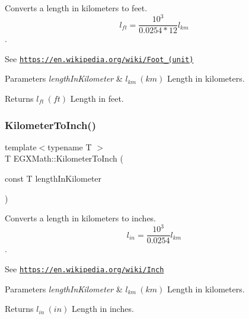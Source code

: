 Converts a length in kilometers to feet. \[ l_{ft}= \frac{10^{3}}{0.0254 * 12} l_{km} \]. 

See \href{https://en.wikipedia.org/wiki/Foot_(unit)}{\tt https\+://en.\+wikipedia.\+org/wiki/\+Foot\+\_\+(unit)} 
\begin{DoxyParams}{Parameters}
{\em length\+In\+Kilometer} & $ l_{km}\ (km)$ Length in kilometers. \\
\hline
\end{DoxyParams}
\begin{DoxyReturn}{Returns}
$ l_{ft}\ (ft)$ Length in feet. 
\end{DoxyReturn}
\mbox{\label{group___e_g_x_math-_conversions-_length_conversions-_s_i-_kilometer-_imperial_ga6f1d41be3b2039495abff4f256148aa7}} 
\subsubsection{\texorpdfstring{Kilometer\+To\+Inch()}{KilometerToInch()}}
{\footnotesize\ttfamily template$<$typename T $>$ \\
T E\+G\+X\+Math\+::\+Kilometer\+To\+Inch (\begin{DoxyParamCaption}\item[{const T}]{length\+In\+Kilometer }\end{DoxyParamCaption})}



Converts a length in kilometers to inches. \[ l_{in}= \frac{10^{3}}{0.0254} l_{km} \]. 

See \href{https://en.wikipedia.org/wiki/Inch}{\tt https\+://en.\+wikipedia.\+org/wiki/\+Inch} 
\begin{DoxyParams}{Parameters}
{\em length\+In\+Kilometer} & $ l_{km}\ (km)$ Length in kilometers. \\
\hline
\end{DoxyParams}
\begin{DoxyReturn}{Returns}
$ l_{in}\ (in)$ Length in inches. 
\end{DoxyReturn}
\mbox{\label{group___e_g_x_math-_conversions-_length_conversions-_s_i-_kilometer-_imperial_ga4d25c16818235ceaad64d1119e23e01f}} 
